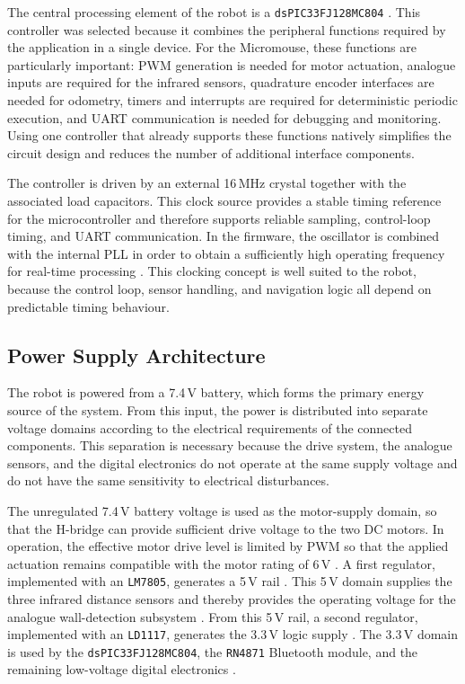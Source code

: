 The central processing element of the robot is a \texttt{dsPIC33FJ128MC804} \cite{datasheet_dspic}. This controller was selected because it combines the peripheral functions required by the application in a single device. For the Micromouse, these functions are particularly important: PWM generation is needed for motor actuation, analogue inputs are required for the infrared sensors, quadrature encoder interfaces are needed for odometry, timers and interrupts are required for deterministic periodic execution, and UART communication is needed for debugging and monitoring. Using one controller that already supports these functions natively simplifies the circuit design and reduces the number of additional interface components.

The controller is driven by an external 16\,MHz crystal together with the associated load capacitors. This clock source provides a stable timing reference for the microcontroller and therefore supports reliable sampling, control-loop timing, and UART communication. In the firmware, the oscillator is combined with the internal PLL in order to obtain a sufficiently high operating frequency for real-time processing \cite{datasheet_dspic}. This clocking concept is well suited to the robot, because the control loop, sensor handling, and navigation logic all depend on predictable timing behaviour.

\subsection{Power Supply Architecture}

The robot is powered from a 7.4\,V battery, which forms the primary energy source of the system. From this input, the power is distributed into separate voltage domains according to the electrical requirements of the connected components. This separation is necessary because the drive system, the analogue sensors, and the digital electronics do not operate at the same supply voltage and do not have the same sensitivity to electrical disturbances.

The unregulated 7.4\,V battery voltage is used as the motor-supply domain, so that the H-bridge can provide sufficient drive voltage to the two DC motors. In operation, the effective motor drive level is limited by PWM so that the applied actuation remains compatible with the motor rating of 6\,V \cite{datasheet_motor}. A first regulator, implemented with an \texttt{LM7805}, generates a 5\,V rail \cite{datasheet_lm7805}. This 5\,V domain supplies the three infrared distance sensors and thereby provides the operating voltage for the analogue wall-detection subsystem \cite{datasheet_sensor}. From this 5\,V rail, a second regulator, implemented with an \texttt{LD1117}, generates the 3.3\,V logic supply \cite{datasheet_ld1117}. The 3.3\,V domain is used by the \texttt{dsPIC33FJ128MC804}, the \texttt{RN4871} Bluetooth module, and the remaining low-voltage digital electronics \cite{datasheet_dspic,datasheet_bluetooth}.

